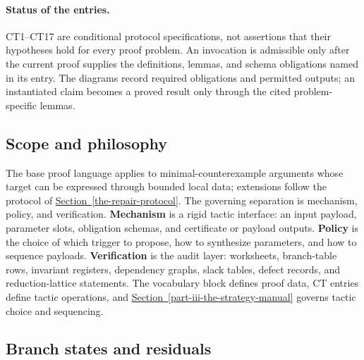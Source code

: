 \documentclass[
  11pt,
]{article}
\theoremstyle{definition}
\newcommand{\secref}[1]{\hyperref[#1]{Section~\ref*{#1}}}
\begin{document}
\paragraph{Status of the entries.}
CT1--CT17 are conditional protocol specifications, not assertions that
their hypotheses hold for every proof problem. An invocation is admissible
only after the current proof supplies the definitions, lemmas, and schema
obligations named in its entry. The diagrams record required obligations and
permitted outputs; an instantiated claim becomes a proved result only through
the cited problem-specific lemmas.


\subsection{Scope and philosophy}\label{scope-and-philosophy}
The base proof language applies to minimal-counterexample arguments whose
target can be expressed through bounded local data; extensions follow the
protocol of \secref{the-repair-protocol}. The governing separation is
mechanism, policy, and verification.  \textbf{Mechanism} is a rigid
tactic interface: an input payload, parameter slots, obligation schemas,
and certificate or payload outputs.  \textbf{Policy} is the choice of
which trigger to propose, how to synthesize parameters, and how to
sequence payloads.  \textbf{Verification} is the audit layer: worksheets,
branch-table rows, invariant registers, dependency graphs, slack tables,
defect records, and reduction-lattice statements. The vocabulary block
defines proof data, CT entries define tactic operations, and
\secref{part-iii-the-strategy-manual} governs tactic choice and
sequencing.

\subsection{Branch states and residuals}\label{data-branch-states}
\end{document}
